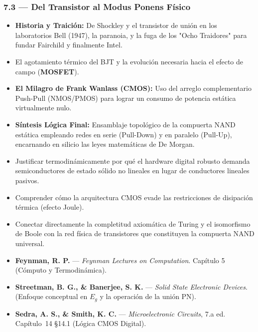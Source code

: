 \documentclass[11pt, letterpaper]{article}
\begin{document}
\subsubsection{7.3 --- Del Transistor al Modus Ponens F\'isico}
\begin{itemize}
  \item \textbf{Historia y Traici\'on:} De Shockley y el transistor de uni\'on en los laboratorios Bell (1947), la paranoia, y la fuga de los "Ocho Traidores" para fundar Fairchild y finalmente Intel.
  \item El agotamiento t\'ermico del BJT y la evoluci\'on necesaria hacia el efecto de campo (\textbf{MOSFET}).
  \item \textbf{El Milagro de Frank Wanlass (CMOS):} Uso del arreglo complementario Push-Pull (NMOS/PMOS) para lograr un consumo de potencia est\'atica virtualmente nulo.
  \item \textbf{S\'intesis L\'ogica Final:} Ensamblaje topol\'ogico de la compuerta NAND est\'atica empleando redes en serie (Pull-Down) y en paralelo (Pull-Up), encarnando en silicio las leyes matemáticas de De Morgan.
\end{itemize}

\begin{objetivos}
\begin{itemize}
  \item Justificar termodin\'amicamente por qu\'e el hardware digital robusto demanda semiconductores de estado s\'olido no lineales en lugar de conductores lineales pasivos.
  \item Comprender cómo la arquitectura CMOS evade las restricciones de disipación térmica (efecto Joule).
  \item Conectar directamente la completitud axiom\'atica de Turing y el isomorfismo de Boole con la red física de transistores que constituyen la compuerta NAND universal.
\end{itemize}
\end{objetivos}

\begin{lecturas}
\begin{itemize}
  \item[$(\star)$] \textbf{Feynman, R. P.} --- \emph{Feynman Lectures on Computation}. Cap\'itulo 5 (C\'omputo y Termodin\'amica).
  \item \textbf{Streetman, B. G., \& Banerjee, S. K.} --- \emph{Solid State Electronic Devices}. (Enfoque conceptual en $E_g$ y la operaci\'on de la uni\'on PN).
  \item \textbf{Sedra, A. S., \& Smith, K. C.} --- \emph{Microelectronic Circuits}, 7.a ed. Cap\'itulo~14 \S14.1 (L\'ogica CMOS Digital).
\end{itemize}
\end{lecturas}
\end{document}
